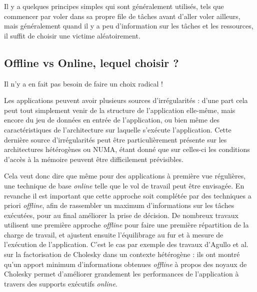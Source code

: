 Il y a quelques principes simples qui sont généralement utilisés, tels que commencer par voler dans sa propre file de tâches avant d'aller voler ailleurs, mais généralement quand il y a peu d'information sur les tâches et les ressources, il suffit de choisir une victime aléatoirement.


\subsection{Offline vs Online, lequel choisir ?}

Il n'y a en fait pas besoin de faire un choix radical !

Les applications peuvent avoir plusieurs sources d'irrégularités : d'une part cela peut tout simplement venir de la structure de l'application elle-même, mais encore du jeu de données en entrée de l'application, ou bien même des caractéristiques de l'architecture sur laquelle s'exécute l'application.
Cette dernière source d'irrégularités peut être particulièrement présente sur les architectures hétérogènes ou NUMA, étant donné que sur celles-ci les conditions d'accès à la mémoire peuvent être difficilement prévisibles.

Cela veut donc dire que même pour des applications à première vue régulières, une technique de base \emph{online} telle que le vol de travail peut être envisagée.
En revanche il est important que cette approche soit complétée par des techniques a priori \emph{offline}, afin de rassembler un maximum d'informations sur les tâches exécutées, pour au final améliorer la prise de décision.
De nombreux travaux utilisent une première approche \emph{offline} pour faire une première répartition de la charge de travail, et ajustent ensuite l'équilibrage au fur et à mesure de l'exécution de l'application.
C'est le cas par exemple des travaux d'Agullo et al.~\cite{Agullo2016} sur la factorisation de Cholesky dans un contexte hétérogène : ils ont montré qu'un apport minimum d'informations obtenues \emph{offline} à propos des noyaux de Cholesky permet d'améliorer grandement les performances de l'application à travers des supports exécutifs \emph{online}.



